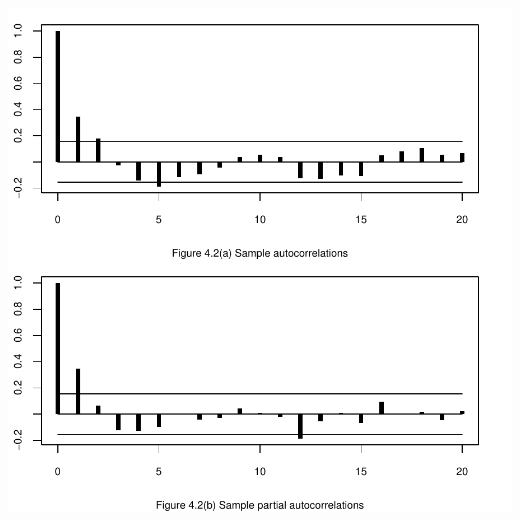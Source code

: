 \documentclass[a4paper]{article}
\begin{document}
\begin{center}
\includegraphics{Companion-027}
\end{center}
\end{document}

